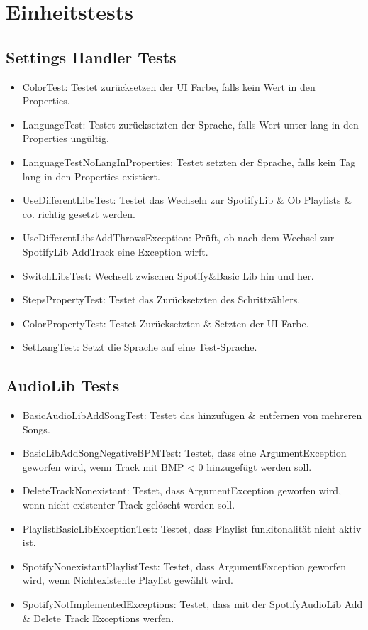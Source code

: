 \documentclass[../validierung.tex]{subfiles}
\begin{document}
	\section{Einheitstests}
		\subsection{Settings Handler Tests}
			\begin{itemize}
				\item ColorTest: Testet zurücksetzen der UI Farbe, falls kein Wert in den Properties.
				\item LanguageTest: Testet zurücksetzten der Sprache, falls Wert unter lang in den Properties ungültig.
				\item LanguageTestNoLangInProperties: Testet setzten der Sprache, falls kein Tag lang in den Properties existiert.
				\item UseDifferentLibsTest: Testet das Wechseln zur SpotifyLib \& Ob Playlists \& co. richtig gesetzt werden.
				\item UseDifferentLibsAddThrowsException: Prüft, ob nach dem Wechsel zur SpotifyLib AddTrack eine Exception wirft.
				\item SwitchLibsTest: Wechselt zwischen Spotify{\&}Basic Lib hin und her.
				\item StepsPropertyTest: Testet das Zurücksetzten des Schrittzählers.
				\item ColorPropertyTest: Testet Zurücksetzten \& Setzten der UI Farbe.
				\item SetLangTest: Setzt die Sprache auf eine Test-Sprache.
			\end{itemize}
		\subsection{AudioLib Tests}
			\begin{itemize}
				\item BasicAudioLibAddSongTest: Testet das hinzufügen \& entfernen von mehreren Songs.
				\item BasicLibAddSongNegativeBPMTest: Testet, dass eine ArgumentException geworfen wird, wenn Track mit BMP < 0 hinzugefügt werden soll.
				\item DeleteTrackNonexistant: Testet, dass ArgumentException geworfen wird, wenn nicht existenter Track gelöscht werden soll.
				\item PlaylistBasicLibExceptionTest: Testet, dass Playlist funkitonalität nicht aktiv ist.
				\item SpotifyNonexistantPlaylistTest: Testet, dass ArgumentException geworfen wird, wenn Nichtexistente Playlist gewählt wird.
				\item SpotifyNotImplementedExceptions: Testet, dass mit der SpotifyAudioLib Add \& Delete Track Exceptions werfen.
			\end{itemize}
\end{document}
